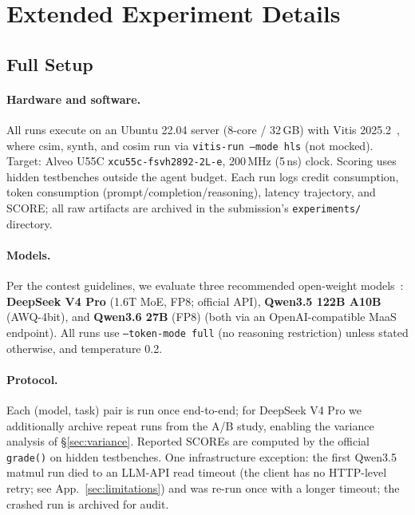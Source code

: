 \documentclass[10pt,conference,letterpaper]{IEEEtran}
\begin{document}
\section{Extended Experiment Details}
\label{app:exp}

\subsection{Full Setup}

\paragraph{Hardware and software.} All runs execute on an Ubuntu 22.04 server (8-core / 32\,GB) with Vitis 2025.2~\cite{ug1399}, where csim, synth, and cosim run via \texttt{vitis-run --mode hls} (not mocked). Target: Alveo U55C \texttt{xcu55c-fsvh2892-2L-e}, 200\,MHz (5\,ns) clock. Scoring uses hidden testbenches outside the agent budget. Each run logs credit consumption, token consumption (prompt/completion/reasoning), latency trajectory, and SCORE; all raw artifacts are archived in the submission's \texttt{experiments/} directory.

\paragraph{Models.} Per the contest guidelines, we evaluate three recommended open-weight models~\cite{fpt26rules,deepseek,qwen}: \textbf{DeepSeek V4 Pro} (1.6T MoE, FP8; official API), \textbf{Qwen3.5 122B A10B} (AWQ-4bit), and \textbf{Qwen3.6 27B} (FP8) (both via an OpenAI-compatible MaaS endpoint). All runs use \texttt{--token-mode full} (no reasoning restriction) unless stated otherwise, and temperature 0.2.

\paragraph{Protocol.} Each (model, task) pair is run once end-to-end; for DeepSeek V4 Pro we additionally archive repeat runs from the A/B study, enabling the variance analysis of \S\ref{sec:variance}. Reported SCOREs are computed by the official \texttt{grade()} on hidden testbenches. One infrastructure exception: the first Qwen3.5 matmul run died to an LLM-API read timeout (the client has no HTTP-level retry; see App.~\ref{sec:limitations}) and was re-run once with a longer timeout; the crashed run is archived for audit.
\end{document}

